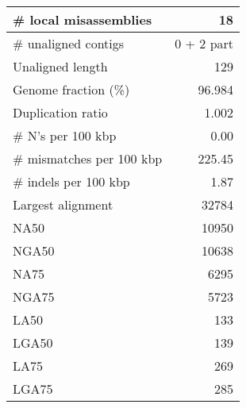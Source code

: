 \documentclass[12pt,a4paper]{article}
\begin{document}
\begin{table}[ht]
\begin{center}
\begin{tabular}{|l*{1}{|r}|}
\# local misassemblies & 18 \\ \hline
\# unaligned contigs & 0 + 2 part \\ \hline
Unaligned length & 129 \\ \hline
Genome fraction (\%) & 96.984 \\ \hline
Duplication ratio & 1.002 \\ \hline
\# N's per 100 kbp & 0.00 \\ \hline
\# mismatches per 100 kbp & 225.45 \\ \hline
\# indels per 100 kbp & 1.87 \\ \hline
Largest alignment & 32784 \\ \hline
NA50 & 10950 \\ \hline
NGA50 & 10638 \\ \hline
NA75 & 6295 \\ \hline
NGA75 & 5723 \\ \hline
LA50 & 133 \\ \hline
LGA50 & 139 \\ \hline
LA75 & 269 \\ \hline
LGA75 & 285 \\ \hline
\end{tabular}
\end{center}
\end{table}
\end{document}
